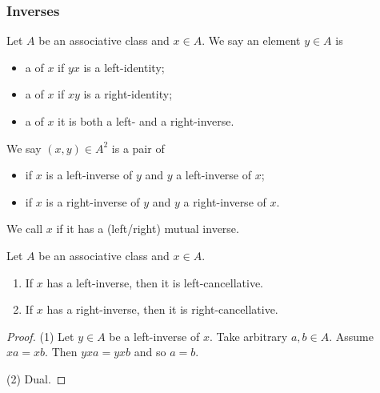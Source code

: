 \subsubsection{Inverses}
\begin{definition}
Let $A$ be an associative class and $x\in A$. 
We say an element $y\in A$ is
\begin{itemize}
\item a  of $x$ if $yx$ is a left-identity;
\item a  of $x$ if $xy$ is a right-identity;
\item a  of $x$ it is both a left- and a right-inverse.
\end{itemize}
We say $(x,y)\in A^2$ is a pair of
\begin{itemize}
\item {} if $x$ is a left-inverse of $y$ and $y$ a left-inverse of $x$;
\item {} if $x$ is a right-inverse of $y$ and $y$ a right-inverse of $x$.
\end{itemize}
We call $x$  if it has a (left/right) mutual inverse.
\end{definition}

\begin{lemma}
Let $A$ be an associative class and $x\in A$.
\begin{enumerate}
\item If $x$ has a left-inverse, then it is left-cancellative.
\item If $x$ has a right-inverse, then it is right-cancellative.
\end{enumerate}
\end{lemma}
\begin{proof}
(1) Let $y\in A$ be a left-inverse of $x$. Take arbitrary $a,b\in A$. Assume $xa = xb$. Then $yxa = yxb$ and so $a = b$.

(2) Dual.
\end{proof}

